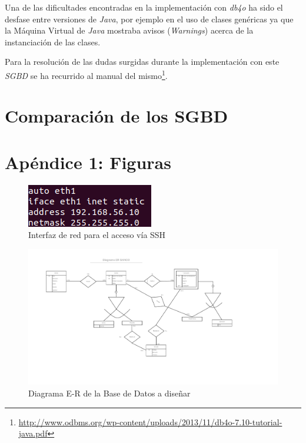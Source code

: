 \documentclass{article}
\begin{document}
Una de las dificultades encontradas en la implementación con \emph{db4o} ha sido el desfase entre versiones de \emph{Java}, por ejemplo en el uso de clases genéricas ya que la Máquina Virtual de \emph{Java} mostraba avisos (\emph{Warnings}) acerca de la instanciación de las clases.

Para la resolución de las dudas surgidas durante la implementación con este \emph{SGBD} se ha recurrido al manual del mismo\footnote{\url{http://www.odbms.org/wp-content/uploads/2013/11/db4o-7.10-tutorial-java.pdf}}.

\section{Comparación de los SGBD}

\newpage
\section{Apéndice 1: Figuras}

\begin{figure}[h!]
	\centering
		\includegraphics[scale=1.5]{images/interfacesred.png}
			\caption{Interfaz de red para el acceso vía SSH}
		\label{FIG:interfacesRED}
\end{figure}

\begin{figure}[h!]
	\centering
		\includegraphics[scale=0.5]{images/diagramaer.png}
			\caption{Diagrama E-R de la Base de Datos a diseñar}
			\label{FIG:diagramaER}
\end{figure}
\end{document}
